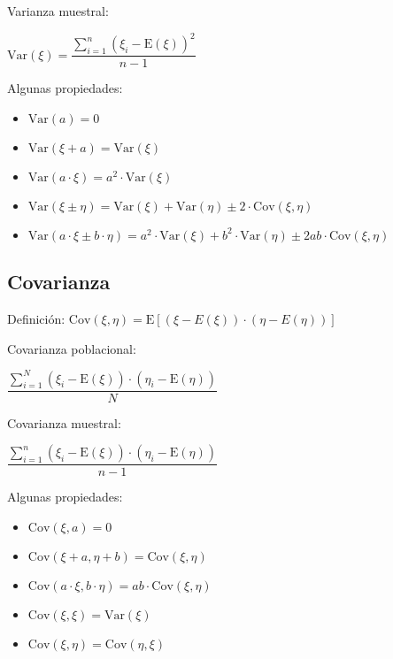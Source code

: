 \documentclass[10pt, a4paper, landscape]{article}
\newcommand{\E}{\mathrm{E}}
\newcommand{\Var}{\mathrm{Var}}
\newcommand{\Cov}{\mathrm{Cov}}
\begin{document}
\begin{multicols}{3}
\begin{multicols}{2}
			\columnbreak
			
			Varianza muestral:
			
			\begin{center}
				$\Var(\xi) = \dfrac{\sum_{i=1}^{n} (\xi_{i} - \E(\xi))^2}{n - 1}$
			\end{center}
		\end{multicols}
		
		Algunas propiedades:
		
		\begin{itemize}[leftmargin=*]
			\item $\Var(a) = 0$
			\item $\Var(\xi + a) = \Var(\xi)$
			\item $\Var(a \cdot \xi) = a^{2} \cdot \Var(\xi)$
			\item $\Var(\xi \pm \eta) = \Var(\xi) + \Var(\eta) \pm 2 \cdot \Cov(\xi, \eta)$
			\item $\Var(a \cdot \xi \pm b \cdot \eta) = a^{2} \cdot \Var(\xi) + b^{2} \cdot \Var(\eta) \pm 2 a b \cdot \Cov(\xi, \eta)$
		\end{itemize}
		
		\subsection*{Covarianza}
		
		Definición: \quad $\Cov(\xi, \eta) = \E[(\xi - E(\xi)) \cdot (\eta - E(\eta))]$
		
		\begin{multicols}{2}
			Covarianza poblacional:
			
			\begin{center}
				$\dfrac{\sum_{i=1}^{N} (\xi_{i} - \E(\xi)) \cdot (\eta_{i} - \E(\eta))}{N}$
			\end{center}
			
			\columnbreak
			
			Covarianza muestral:
			
			\begin{center}
				$\dfrac{\sum_{i=1}^{n} (\xi_{i} - \E(\xi)) \cdot (\eta_{i} - \E(\eta))}{n - 1}$
			\end{center}
		\end{multicols}
		
		Algunas propiedades:
		
		\begin{itemize}[leftmargin=*]
			\item $\Cov(\xi, a) = 0$
			\item $\Cov(\xi + a, \eta + b) = \Cov(\xi, \eta)$
			\item $\Cov(a \cdot \xi, b \cdot \eta) = a b \cdot \Cov(\xi, \eta)$
			\item $\Cov(\xi, \xi) = \Var(\xi)$
			\item $\Cov(\xi, \eta) = \Cov(\eta, \xi)$
		\end{itemize}
		

\end{multicols}
\end{document}
